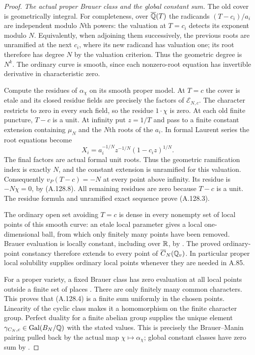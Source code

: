 \begin{proof}
\emph{The actual proper Brauer class and the global constant sum.}
The old cover is geometrically integral.
For completeness, over $\overline{\mathbb Q}(T)$ the radicands
$(T-c_i)/a_i$ are independent modulo $N$th powers:
the valuation at $T=c_i$ detects its exponent modulo $N$.
Equivalently, when adjoining them successively, the
previous roots are unramified at the next $c_i$, where
its new radicand has valuation one; its root therefore
has degree $N$ by the valuation criterion.
Thus the geometric degree is $N^k$.
The ordinary curve is smooth, since each nonzero-root
equation has invertible derivative in characteristic zero.

Compute the residues of $\alpha_\chi$ on its smooth
proper model.
At $T=c$ the cover is etale and its closed residue
fields are precisely the factors of $\mathcal E_{N,c}$.
The character restricts to zero in every such field,
so the residue $1\cdot\chi$ is zero.
At each old finite puncture, $T-c$ is a unit.
At infinity put $z=1/T$ and pass to a finite constant
extension containing $\mu_N$ and the $N$th roots of
the $a_i$.
In formal Laurent series the root equations become
\[
        X_i=a_i^{-1/N}z^{-1/N}(1-c_i z)^{1/N}.
\tag{A.128.26}
\]
The final factors are actual formal unit roots.
Thus the geometric ramification index is exactly $N$,
and the constant extension is unramified for this
valuation.  Consequently $v_P(T-c)=-N$ at every
point above infinity.
Its residue is $-N\chi=0$, by (A.128.8).
All remaining residues are zero because $T-c$ is a unit.
The residue formula and unramified exact sequence
\cite[\S1.4 and Corollary 3.7.3]{AgentCTSkoro2019}
prove (A.128.3).

The ordinary open set avoiding $T=c$ is dense in
every nonempty set of local points of this smooth
curve: an etale local parameter gives a local
one-dimensional ball, from which only finitely
many points have been removed.
Brauer evaluation is locally constant, including
over $\mathbb R$, by
\cite[Proposition 9.5.2]{AgentCTSkoro2019}.
The proved ordinary-point constancy therefore extends
to every point of $\overline C_N(\mathbb Q_v)$.
In particular proper local solubility supplies ordinary
local points whenever they are needed in A.85.

For a proper variety, a fixed Brauer class has zero
evaluation at all local points outside a finite set
of places
\cite[Proposition 12.3.1(iii)]{AgentCTSkoro2019}.
There are only finitely many common characters.
This proves that (A.128.4) is a finite sum uniformly
in the chosen points.
Linearity of the cyclic class makes it a homomorphism
on the finite character group.
Perfect duality for a finite abelian group supplies
the unique element $\gamma_{C_N,c}\in
\operatorname{Gal}(B_N/\mathbb Q)$ with the stated values.
This is precisely the Brauer--Manin pairing pulled
back by the actual map $\chi\mapsto\alpha_\chi$;
global constant classes have zero sum by
\cite[Theorem 12.1.8]{AgentCTSkoro2019}.


\end{proof}
